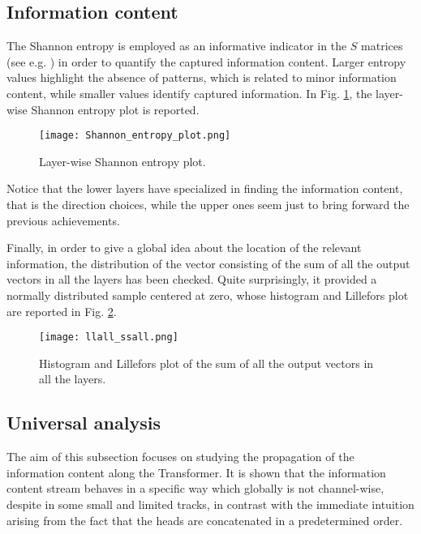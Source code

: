 \documentclass[11pt,a4paper,reqno]{amsart} %
\theoremstyle{definition}
\numberwithin{equation}{section}          %
\begin{document}
\subsection{Information content}

The Shannon entropy is employed as an informative indicator in the $S$ matrices (see e.g. \cite{entr}) in order to quantify the captured information content. Larger entropy values highlight the absence of patterns, which is related to minor information content, while smaller values identify captured information. In Fig. \ref{fig:Shannon_entropy_plot}, the layer-wise Shannon entropy plot is reported. %
\begin{figure}[h!]
\centering
{\texttt{[image: Shannon\_entropy\_plot.png]}}
\caption{Layer-wise Shannon entropy plot.}
\label{fig:Shannon_entropy_plot}
\end{figure}
Notice that the lower layers have specialized in finding the information content, that is the direction choices, while the upper ones seem just to bring forward the previous achievements.

\par 

Finally, in order to give a global idea about the location of the relevant information, the distribution of the vector consisting of the sum of all the output vectors in all the layers has been checked. Quite surprisingly, it provided a normally distributed sample centered at zero, whose histogram and Lillefors plot are reported in Fig. \ref{fig:llall_ssall}.
\begin{figure}[h!]
    \centering
    {\texttt{[image: llall\_ssall.png]}}
    \caption{Histogram and Lillefors plot of the sum of all the output vectors in all the layers.}
    \label{fig:llall_ssall}
\end{figure}





\subsection{Universal analysis}

The aim of this subsection focuses on studying the propagation of the information content along the Transformer. It is shown that the information content stream behaves in a specific way which globally is not channel-wise, despite in some small and limited tracks, in contrast with the immediate intuition arising from the fact that the heads are concatenated in a predetermined order. 
\end{document}
